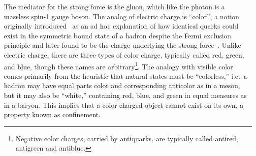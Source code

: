 The mediator for the strong force is the gluon, which like the photon is a massless spin-1 gauge boson.
The analog of electric charge is ``color'', a notion originally introduced~\cite{PhysRevLett.13.598} as an ad hoc explanation of how identical quarks could exist in the symmetric bound state of a hadron despite the Fermi exclusion principle and later found to be the charge underlying the strong force~\cite{Griffiths:111880,10.2307/24949915}.
Unlike electric charge, there are three types of color charge, typically called red, green, and blue, though these names are arbitrary\footnote{Negative color charges, carried by antiquarks, are typically called antired, antigreen and antiblue.}.
The analogy with visible color comes primarily from the heuristic that natural states must be ``colorless,'' i.e.\ a hadron may have equal parts color and corresponding anticolor as in a meson, but it may also be ``white,'' containing red, blue, and green in equal measures as in a baryon.
This implies that a color charged object cannot exist on its own, a property known as confinement.


